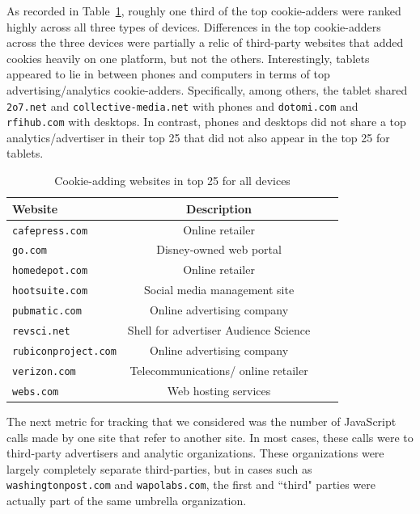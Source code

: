 \documentclass{acm_proc_article-sp}
\begin{document}
As recorded in Table~\ref{tab:major_cookies}, roughly one third of the top cookie-adders were ranked highly across all three types of devices. Differences in the top cookie-adders across the three devices were partially a relic of third-party websites that added cookies heavily on one platform, but not the others. Interestingly, tablets appeared to lie in between phones and computers in terms of top advertising/analytics cookie-adders. Specifically, among others, the tablet shared \texttt{2o7.net} and \texttt{collective-media.net} with phones and \texttt{dotomi.com} and \texttt{rfihub.com} with desktops. In contrast, phones and desktops did not share a top analytics/advertiser in their top 25 that did not also appear in the top 25 for tablets.


\begin{table}[htbp]
  \centering
  \caption{Cookie-adding websites in top 25 for all devices}
    \begin{tabular}{|c|c|c|c|}
    \hline
     \multicolumn{1}{|l|}{\textbf{Website}} & \textbf{Description}    \\ \hline
    \multicolumn{1}{|l|}{\texttt{cafepress.com}} & Online retailer   \\
    \multicolumn{1}{|l|}{\texttt{go.com}} & Disney-owned web portal  \\
    \multicolumn{1}{|l|}{\texttt{homedepot.com}} & Online retailer    \\
    \multicolumn{1}{|l|}{\texttt{hootsuite.com}} & Social media management site   \\
    \multicolumn{1}{|l|}{\texttt{pubmatic.com}} & Online advertising company   \\
    \multicolumn{1}{|l|}{\texttt{revsci.net}} & Shell for advertiser Audience Science    \\
    \multicolumn{1}{|l|}{\texttt{rubiconproject.com}} & Online advertising company   \\
    \multicolumn{1}{|l|}{\texttt{verizon.com}} & Telecommunications/ online retailer   \\
    \multicolumn{1}{|l|}{\texttt{webs.com}} & Web hosting services  \\ \hline
    \end{tabular}%
  \label{tab:major_cookies}%
\end{table}%

The next metric for tracking that we considered was the number of JavaScript calls made by one site that refer to another site. In most cases, these calls were to third-party advertisers and analytic organizations. These organizations were largely completely separate third-parties, but in cases such as \texttt{washingtonpost.com} and \texttt{wapolabs.com}, the first and  ``third" parties were actually part of the same umbrella organization. 
\end{document}
